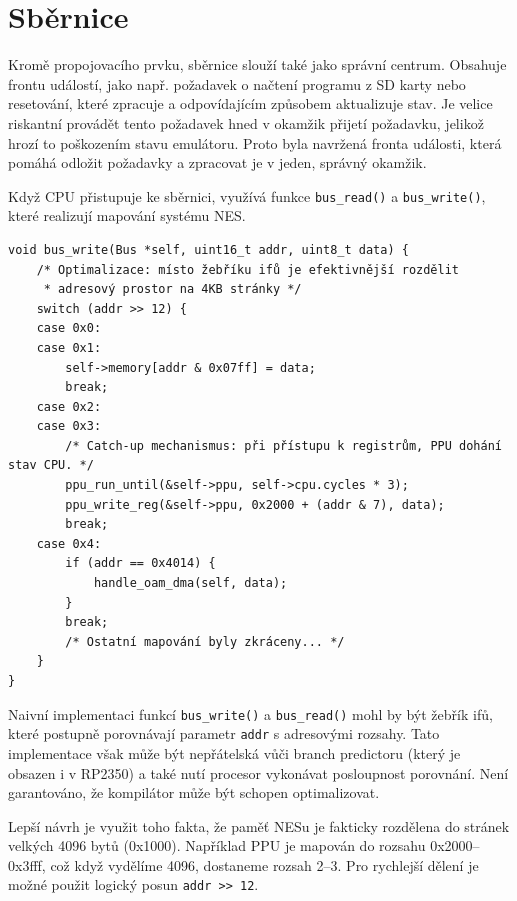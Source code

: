 \section{Sběrnice}

Kromě propojovacího prvku, sběrnice slouží také jako správní centrum. Obsahuje frontu událostí, jako
např. požadavek o načtení programu z SD karty nebo resetování, které zpracuje a odpovídajícím
způsobem aktualizuje stav. Je velice riskantní provádět tento požadavek hned v okamžik přijetí
požadavku, jelikož hrozí to poškozením stavu emulátoru. Proto byla navržená fronta události, která
pomáhá odložit požadavky a zpracovat je v jeden, správný okamžik.

Když CPU přistupuje ke sběrnici, využívá funkce \texttt{bus\_read()} a \texttt{bus\_write()}, které
realizují mapování systému NES.

\begin{listing}[htbp]
\begin{verbatim}
void bus_write(Bus *self, uint16_t addr, uint8_t data) {
    /* Optimalizace: místo žebříku ifů je efektivnější rozdělit
     * adresový prostor na 4KB stránky */
    switch (addr >> 12) {
    case 0x0:
    case 0x1:
        self->memory[addr & 0x07ff] = data;
        break;
    case 0x2:
    case 0x3:
        /* Catch-up mechanismus: při přístupu k registrům, PPU dohání stav CPU. */
        ppu_run_until(&self->ppu, self->cpu.cycles * 3);
        ppu_write_reg(&self->ppu, 0x2000 + (addr & 7), data);
        break;
    case 0x4:
        if (addr == 0x4014) {
            handle_oam_dma(self, data);
        }
        break;
        /* Ostatní mapování byly zkráceny... */
    }
}
\end{verbatim}
\caption{Komunikační rozhraní sběrnice (příklad funkce pro zápis do adresního prostoru).}
\end{listing}

Naivní implementaci funkcí \texttt{bus\_write()} a \texttt{bus\_read()} mohl by být žebřík ifů,
které postupně porovnávají parametr \texttt{addr} s adresovými rozsahy. Tato implementace však může
být nepřátelská vůči branch predictoru (který je obsazen i v RP2350) a také nutí procesor vykonávat
posloupnost porovnání. Není garantováno, že kompilátor může být schopen optimalizovat.

Lepší návrh je využit toho fakta, že paměť NESu je fakticky rozdělena do stránek velkých 4096 bytů
(0x1000). Například PPU je mapován do rozsahu 0x2000--0x3fff, což když vydělíme 4096, dostaneme
rozsah 2--3. Pro rychlejší dělení je možné použit logický posun \texttt{addr >> 12}.


